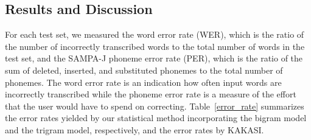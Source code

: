 \subsection{Results and Discussion}
For each test set, we measured the word error rate (WER), which is
the ratio of the number of incorrectly transcribed words to the
total number of words in the test set, and the SAMPA-J phoneme
error rate (PER), which is the ratio of the sum of deleted,
inserted, and substituted phonemes to the total number of
phonemes. The word error rate is an indication how often input
words are incorrectly transcribed while the phoneme error rate is
a measure of the effort that the user would have to spend on
correcting. Table~\ref{error_rate} summarizes the error rates
yielded by our statistical method incorporating the bigram model
and the trigram model, respectively, and the error rates by
KAKASI.
\renewcommand{\baselinestretch}{}
